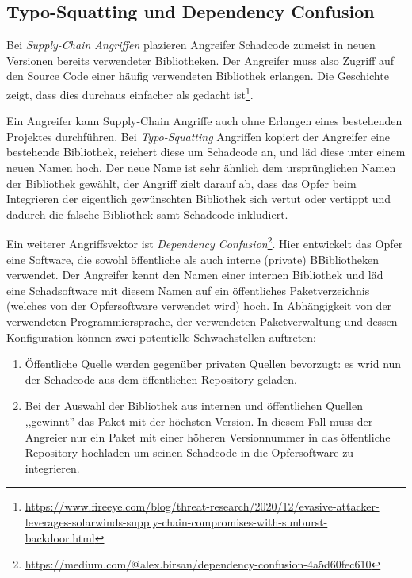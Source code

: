 \subsection{Typo-Squatting und Dependency Confusion}

Bei \textit{Supply-Chain Angriffen} plazieren Angreifer Schadcode zumeist in neuen Versionen bereits verwendeter Bibliotheken. Der Angreifer muss also Zugriff auf den Source Code einer häufig verwendeten Bibliothek erlangen. Die Geschichte zeigt, dass dies durchaus einfacher als gedacht ist\footnote{\url{https://www.fireeye.com/blog/threat-research/2020/12/evasive-attacker-leverages-solarwinds-supply-chain-compromises-with-sunburst-backdoor.html}}.

Ein Angreifer kann Supply-Chain Angriffe auch ohne Erlangen eines bestehenden Projektes durchführen. Bei \textit{Typo-Squatting} Angriffen kopiert der Angreifer eine bestehende Bibliothek, reichert diese um Schadcode an, und läd diese unter einem neuen Namen hoch. Der neue Name ist sehr ähnlich dem ursprünglichen Namen der Bibliothek gewählt, der Angriff zielt darauf ab, dass das Opfer beim Integrieren der eigentlich gewünschten Bibliothek sich vertut oder vertippt und dadurch die falsche Bibliothek samt Schadcode inkludiert.

Ein weiterer Angriffsvektor ist \textit{Dependency Confusion}\footnote{\url{https://medium.com/@alex.birsan/dependency-confusion-4a5d60fec610}}. Hier entwickelt das Opfer eine Software, die sowohl öffentliche als auch interne (private) BBibliotheken verwendet. Der Angreifer kennt den Namen einer internen Bibliothek und läd eine Schadsoftware mit diesem Namen auf ein öffentliches Paketverzeichnis (welches von der Opfersoftware verwendet wird) hoch. In Abhängigkeit von der verwendeten Programmiersprache, der verwendeten Paketverwaltung und dessen Konfiguration können zwei potentielle Schwachstellen auftreten:

\begin{enumerate}
	\item Öffentliche Quelle werden gegenüber privaten Quellen bevorzugt: es wrid nun der Schadcode aus dem öffentlichen Repository geladen.
	\item Bei der Auswahl der Bibliothek aus internen und öffentlichen Quellen ,,gewinnt'' das Paket mit der höchsten Version. In diesem Fall muss der Angreier nur ein Paket mit einer höheren Versionnummer in das öffentliche Repository hochladen um seinen Schadcode in die Opfersoftware zu integrieren.
\end{enumerate}

